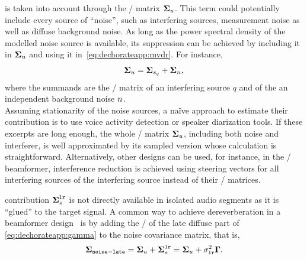  is taken into account through the \PSD/ matrix $\boldsymbol{\Sigma}_u$.
This term could potentially include every source of ``noise'', such as interfering sources, measurement noise as well as diffuse background noise.
As long as the power spectral density of the modelled noise source is available, its suppression can be achieved by including it in $\boldsymbol{\Sigma}_u$ and using it in~\cref{eq:dechorateapp:mvdr}. 
For instance,
\begin{equation}
    \boldsymbol{\Sigma}_u = \boldsymbol{\Sigma}_{s_q} + \boldsymbol{\Sigma}_{n}
    ,
\end{equation}
where the summands are the \PSD/ matrix of an interfering source $q$ and of the an independent background noise $n$.
\\Assuming stationarity of the noise sources, a na\"ive approach to estimate their contribution is to use voice activity detection or speaker diarization tools.
If these excerpts are long enough, the whole \PSD/ matrix $\boldsymbol{\Sigma}_u$, including both noise and interferer, is well approximated by its sampled version whose calculation is straightforward.
Alternatively, other designs can be used, for instance, in the \LCMVtxt/ beamformer, interference reduction is achieved using steering vectors for all interfering sources of the interfering source instead of their \PSD/ matrices.

 contribution $\boldsymbol{\Sigma}_{s}^{\mathtt{lr}}$ is not directly available in isolated audio segments as it is ``glued'' to the target signal.
A common way to achieve dereverberation in a beamformer design~ is by adding
the \PSD/ of the late diffuse part of \cref{eq:dechorateapp:gamma} to the noise covariance matrix, that is,
\begin{equation}
    \boldsymbol{\Sigma}_{\mathtt{noise-late}} =  \boldsymbol{\Sigma}_{u} + \boldsymbol{\Sigma}_{s}^{\mathtt{lr}} =  \boldsymbol{\Sigma}_{u} + \sigma_{\mathtt{lr}}^2\mathbf{\Gamma}
    .
\end{equation}


